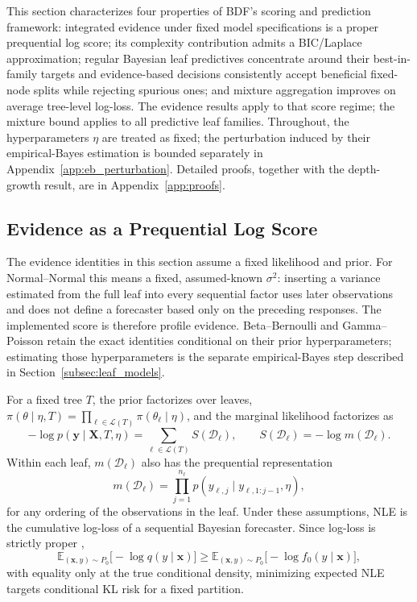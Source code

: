 \documentclass[10pt]{article} %
\begin{document}
This section characterizes four properties of BDF's scoring and prediction framework: integrated evidence under fixed model specifications is a proper prequential log score; its complexity contribution admits a BIC/Laplace approximation; regular Bayesian leaf predictives concentrate around their best-in-family targets and evidence-based decisions consistently accept beneficial fixed-node splits while rejecting spurious ones; and mixture aggregation improves on average tree-level log-loss. The evidence results apply to that score regime; the mixture bound applies to all predictive leaf families. Throughout, the hyperparameters $\eta$ are treated as fixed; the perturbation induced by their empirical-Bayes estimation is bounded separately in Appendix~\ref{app:eb_perturbation}. Detailed proofs, together with the depth-growth result, are in Appendix~\ref{app:proofs}.

\subsection{Evidence as a Prequential Log Score}\label{subsec:theory_prequential}

The evidence identities in this section assume a fixed likelihood and prior. For Normal--Normal this means a fixed, assumed-known $\sigma^2$: inserting a variance estimated from the full leaf into every sequential factor uses later observations and does not define a forecaster based only on the preceding responses. The implemented score is therefore profile evidence. Beta--Bernoulli and Gamma--Poisson retain the exact identities conditional on their prior hyperparameters; estimating those hyperparameters is the separate empirical-Bayes step described in Section~\ref{subsec:leaf_models}.

For a fixed tree $T$, the prior factorizes over leaves,
$\pi(\theta\mid \eta,T)=\prod_{\ell\in\mathcal{L}(T)}\pi(\theta_\ell\mid\eta)$, and the marginal likelihood factorizes as
\begin{equation}\label{eq:global_nle_sum}
-\log p(\mathbf{y}\mid\mathbf{X},T,\eta)
=
\sum_{\ell\in\mathcal{L}(T)} S(\mathcal{D}_\ell),
\qquad
S(\mathcal{D}_\ell)=-\log m(\mathcal{D}_\ell).
\end{equation}
Within each leaf, $m(\mathcal{D}_\ell)$ also has the prequential representation
\[
m(\mathcal{D}_\ell)
=
\prod_{j=1}^{n_\ell} p(y_{\ell,j}\mid y_{\ell,1:j-1}, \eta),
\]
for any ordering of the observations in the leaf. Under these assumptions, NLE is the cumulative log-loss of a sequential Bayesian forecaster. Since log-loss is strictly proper \citep{gneiting2007strictly},
\begin{equation}\label{eq:proper_log_score}
\mathbb{E}_{(\mathbf{x},y)\sim P_0}\big[-\log q(y\mid \mathbf{x})\big]
\ge
\mathbb{E}_{(\mathbf{x},y)\sim P_0}\big[-\log f_0(y\mid \mathbf{x})\big],
\end{equation}
with equality only at the true conditional density, minimizing expected NLE targets conditional KL risk for a fixed partition.
\end{document}
